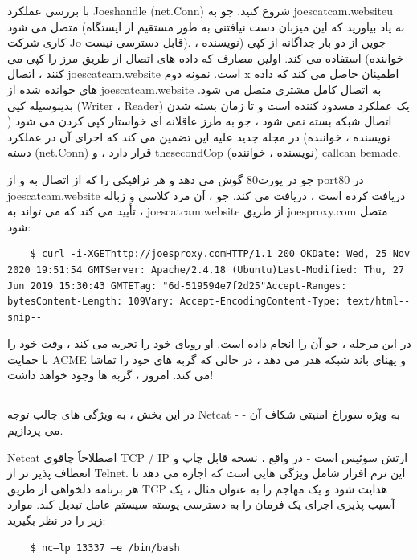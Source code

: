 \documentclass[12pt]{book}
\begin{document}
{با بررسی عملکرد Joeshandle (net.Conn) شروع کنید. جو به joescatcam.websiteu متصل می شود (به یاد بیاورید که این میزبان دست نیافتنی به طور مستقیم از ایستگاه کاری شرکت Jo قابل دسترسی نیست). جوین از دو بار جداگانه از کپی (نویسنده ، خواننده) استفاده می کند. اولین مصارف که داده های اتصال از طریق مرز را کپی می کنند ، اتصال joescatcam.website است. نمونه دوم x اطمینان حاصل می کند که داده های خوانده شده از joescatcam.website به اتصال کامل مشتری متصل می شود. بدینوسیله کپی (Writer ، Reader) یک عملکرد مسدود کننده است و تا زمان بسته شدن اتصال شبکه بسته نمی شود ، جو به طرز عاقلانه ای خواستار کپی کردن می شود ( نویسنده ، خواننده) در مجله جدید علیه این تضمین می کند که اجرای آن در عملکرد دسته (net.Conn) قرار دارد ، و thesecondCop (نویسنده ، خواننده) callcan bemade.

جو در پورت80 گوش می دهد و هر ترافیکی را که از اتصال به و از port80 در joescatcam.website دریافت کرده است ، دریافت می کند. جو ، آن مرد كلاسی و زباله ، تأیید می كند كه می تواند به joescatcam.website از طریق joesproxy.com متصل شود:
\begin{latin}
	\begin{lstlisting}
	$ curl -i-XGEThttp://joesproxy.comHTTP/1.1 200 OKDate: Wed, 25 Nov 2020 19:51:54 GMTServer: Apache/2.4.18 (Ubuntu)Last-Modified: Thu, 27 Jun 2019 15:30:43 GMTETag: "6d-519594e7f2d25"Accept-Ranges: bytesContent-Length: 109Vary: Accept-EncodingContent-Type: text/html--snip--
	\end{lstlisting}
\end{latin}

در این مرحله ، جو آن را انجام داده است. او رویای خود را تجربه می کند ، وقت خود را با حمایت ACME و پهنای باند شبکه هدر می دهد ، در حالی که گربه های خود را تماشا می کند. امروز ، گربه ها وجود خواهد داشت!
\subsection{}
در این بخش ، به ویژگی های جالب توجه Netcat - به ویژه سوراخ امنیتی شکاف آن - می پردازیم.

Netcat اصطلاحاً چاقوی TCP / IP ارتش سوئیس است - در واقع ، نسخه قابل چاپ و انعطاف پذیر تر از Telnet. این نرم افزار شامل ویژگی هایی است که اجازه می دهد تا هر برنامه دلخواهی از طریق TCP هدایت شود و یک مهاجم را به عنوان مثال ، یک آسیب پذیری اجرای یک فرمان را به دسترسی پوسته سیستم عامل تبدیل کند. موارد زیر را در نظر بگیرید:
\begin{latin}
	\begin{lstlisting}
	$ nc–lp 13337 –e /bin/bash
	\end{lstlisting}
\end{latin}

}
\end{document}

